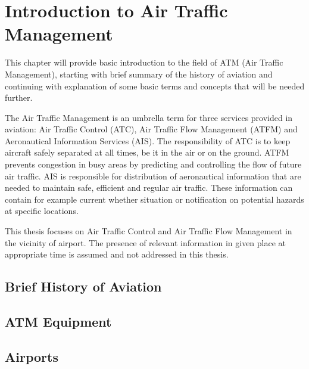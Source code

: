 \chapter{Introduction to Air Traffic Management}

This chapter will provide basic introduction to the field of ATM (Air Traffic Management), starting with brief summary of the history of aviation and continuing with explanation of some basic terms and concepts that will be needed further.

The Air Traffic Management is an umbrella term for three services provided in aviation: Air Traffic Control (ATC), Air Traffic Flow Management (ATFM) and Aeronautical Information Services (AIS). The responsibility of ATC is to keep aircraft safely separated at all times, be it in the air or on the ground. ATFM prevents congestion in busy areas by predicting and controlling the flow of future air traffic. AIS is responsible for distribution of aeronautical information that are needed to maintain safe, efficient and regular air traffic. These information can contain for example current whether situation or notification on potential hazards at specific locations. \cite{atm}

This thesis focuses on Air Traffic Control and Air Traffic Flow Management in the vicinity of airport. The presence of relevant information in given place at appropriate time is assumed and not addressed in this thesis.

\section{Brief History of Aviation}
\cite{nolan}

\section{ATM Equipment}








\section{Airports}
